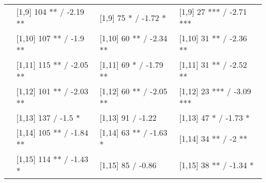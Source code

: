 \begin{table}
\begin{tabular}[t]{llll}
 & {}[1,9] 104 ** / -2.19 ** & {}[1,9] 75 * / -1.72 * & {}[1,9] 27 *** / -2.71 ***\\
 & {}[1,10] 107 ** / -1.9 ** & {}[1,10] 60 ** / -2.34 ** & {}[1,10] 31 ** / -2.36 **\\
 & {}[1,11] 115 ** / -2.05 ** & {}[1,11] 69 * / -1.79 ** & {}[1,11] 31 ** / -2.52 **\\
 & {}[1,12] 101 ** / -2.03 ** & {}[1,12] 60 ** / -2.05 ** & {}[1,12] 23 *** / -3.09 ***\\
\addlinespace
 & {}[1,13] 137  / -1.5 * & {}[1,13] 91  / -1.22 & {}[1,13] 47 * / -1.73 *\\
 & {}[1,14] 105 ** / -1.84 ** & {}[1,14] 63 ** / -1.63 * & {}[1,14] 34 ** / -2 **\\
 & {}[1,15] 114 ** / -1.43 * & {}[1,15] 85  / -0.86 & {}[1,15] 38 ** / -1.34 *\\
\bottomrule
\end{tabular}
\end{table}
